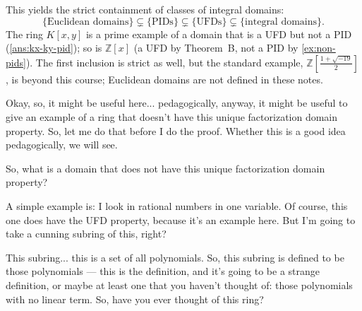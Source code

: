 \begin{content}

\begin{steps}
This yields the strict containment of classes of integral domains:
\[
\{\text{Euclidean domains}\} \subsetneq \{\text{PIDs}\} \subsetneq \{\text{UFDs}\} \subsetneq \{\text{integral domains}\}.
\]
The ring $K[x, y]$ is a prime example of a domain that is a UFD but not a PID (\cref{ans:kx-ky-pid}); so is $\mathbb{Z}[x]$ (a UFD by Theorem~B, not a PID by \cref{ex:non-pids}). The first inclusion is strict as well, but the standard example, $\mathbb{Z}[\frac{1 + \sqrt{-19}}{2}]$, is beyond this course; Euclidean domains are not defined in these notes.
\end{steps}
\end{content}

\begin{speech}[00:22:15 - 00:23:45]
Okay, so, it might be useful here... pedagogically, anyway, it might be useful to give an example of a ring that doesn't have this unique factorization domain property. So, let me do that before I do the proof. Whether this is a good idea pedagogically, we will see.

So, what is a domain  that does not have this unique factorization domain property? 

A simple example is: I look in rational numbers  in one variable. Of course, this one does have the UFD property, because it's an example here. But I'm going to take a cunning subring of this,  right?

This subring... this is a set of all polynomials. So, this subring is defined to be those polynomials --- this is the definition,  and it's going to be a strange definition, or maybe at least one that you haven't thought of: those polynomials with no linear term.  So, have you ever thought of this ring?
\end{speech}

